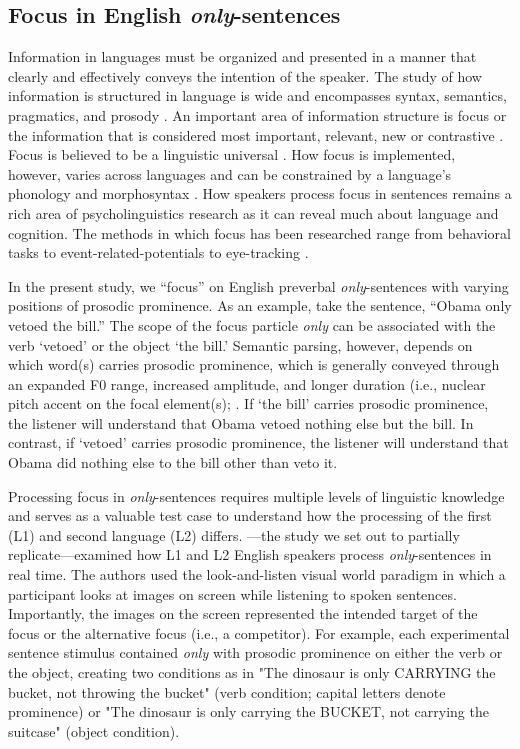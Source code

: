 \subsection{Focus in English \textit{only}-sentences}

Information in languages must be organized and presented in a manner that clearly and effectively conveys the intention of the speaker. The study of how information is structured in language is wide and encompasses syntax, semantics, pragmatics, and prosody \citep[see ][] {Breen2010, Lambrecht1994, Roberts2012}. An important area of information structure is focus or the information that is considered most important, relevant, new or contrastive \citep{Kiss1998}. Focus is believed to be a linguistic universal \citep{Comrie1989}. How focus is implemented, however, varies across languages and can be constrained by a language’s phonology and morphosyntax \citep{Kiss1998, Lambrecht1994}. How speakers process focus in sentences remains a rich area of psycholinguistics research as it can reveal much about language and cognition. The methods in which focus has been researched range from behavioral tasks \citep[e.g.,][] {Cutler1979, Paterson1999} to event-related-potentials \citep[e.g.,][] {Chen2014, Wang2011} to eye-tracking \citep[e.g.,][] {Filik2005, Hohle2016}.

In the present study, we “focus” on English preverbal \textit{only}-sentences with varying positions of prosodic prominence. As an example, take the sentence, “Obama only vetoed the bill.” The scope of the focus particle \textit{only} can be associated with the verb ‘vetoed’ or the object ‘the bill.’ Semantic parsing, however, depends on which word(s) carries prosodic prominence, which is generally conveyed through an expanded F0 range, increased amplitude, and longer duration (i.e., nuclear pitch accent on the focal element(s); \citep{Breen2010, Gussenhoven1983}.  If ‘the bill’ carries prosodic prominence, the listener will understand that Obama vetoed nothing else but the bill. In contrast, if ‘vetoed’ carries prosodic prominence, the listener will understand that Obama did nothing else to the bill other than veto it. 

Processing focus in \textit{only}-sentences requires multiple levels of linguistic knowledge and serves as a valuable test case to understand how the processing of the first (L1) and second language (L2) differs. \cite{Ge2021}---the study we set out to partially replicate---examined how L1 and L2 English speakers process \textit{only}-sentences in real time. The authors used the look-and-listen visual world paradigm in which a participant looks at images on screen while listening to spoken sentences. Importantly, the images on the screen represented the intended target of the focus or the alternative focus (i.e., a competitor). For example, each experimental sentence stimulus contained \textit{only} with prosodic prominence on either the verb or the object, creating two conditions as in "The dinosaur is only CARRYING the bucket, not throwing the bucket" (verb condition; capital letters denote prominence) or "The dinosaur is only carrying the BUCKET, not carrying the suitcase" (object condition).


